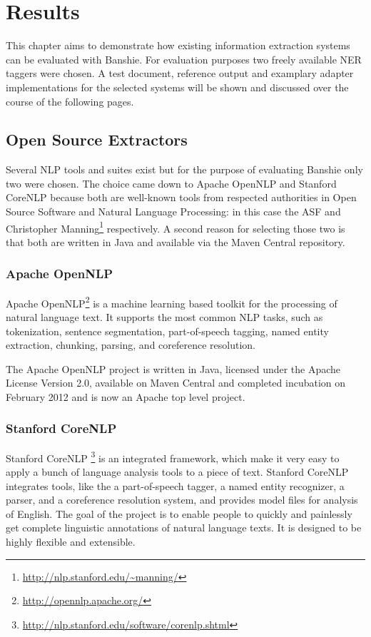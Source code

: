 \section{Results}
\label{sec:results}
This chapter aims to demonstrate how existing information extraction systems can be evaluated with Banshie. For evaluation purposes two freely available \gls{NER} taggers were chosen. A test document, reference output and examplary adapter implementations for the selected systems will be shown and discussed over the course of the following pages.

\subsection{Open Source Extractors}
Several \gls{NLP} tools and suites exist but for the purpose of evaluating Banshie only two were chosen. The choice came down to Apache OpenNLP and Stanford CoreNLP because both are well-known tools from respected authorities in Open Source Software and Natural Language Processing: in this case the \acs{ASF} and Christopher Manning\footnote{\url{http://nlp.stanford.edu/~manning/}} respectively. A second reason for selecting those two is that both are written in Java and available via the Maven Central repository.

\subsubsection{Apache OpenNLP}
Apache OpenNLP\footnote{\url{http://opennlp.apache.org/}} is a machine learning based toolkit for the processing of natural language text. It supports the most common NLP tasks, such as tokenization, sentence segmentation, part-of-speech tagging, named entity extraction, chunking, parsing, and coreference resolution. \cite{OpenNLP}

The Apache OpenNLP project is written in Java, licensed under the Apache License Version 2.0, available on Maven Central and completed incubation on February 2012 and is now an Apache top level project.

\subsubsection{Stanford CoreNLP}
Stanford CoreNLP
\footnote{\url{http://nlp.stanford.edu/software/corenlp.shtml}} is an integrated framework, which make it very easy to apply a bunch of language analysis tools to a piece of text. Stanford CoreNLP integrates tools, like the a part-of-speech tagger, a named entity recognizer, a parser, and a coreference resolution system, and provides model files for analysis of English. The goal of the project is to enable people to quickly and painlessly get complete linguistic annotations of natural language texts. It is designed to be highly flexible and extensible. \cite{CoreNLP}

